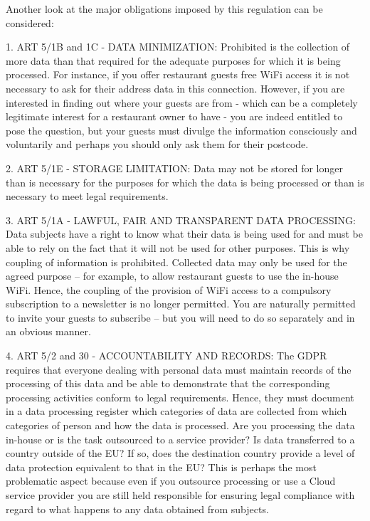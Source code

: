 \documentclass[12pt]{amsart}
\begin{document}
\begin{multicols}{2}
Another look at the major obligations imposed by this
regulation can be considered\cite{tata17}:


\vspace{0.35cm}
1. ART 5/1B and 1C - DATA MINIMIZATION:
Prohibited is the collection of more data than that required for the
adequate purposes for which it is being processed. For instance, if
you offer restaurant guests free WiFi access it is not necessary to
ask for their address data in this connection. However, if you are
interested in finding out where your guests are from - which can be a
completely legitimate interest for a restaurant owner to have - you
are indeed entitled to pose the question, but your guests must divulge
the information consciously and voluntarily and perhaps you should
only ask them for their postcode.

\vspace{0.35cm}
2. ART 5/1E - STORAGE LIMITATION:
Data may not be stored for longer than is necessary for the purposes
for which the data is being processed or than is necessary to meet
legal requirements.

\vspace{0.35cm}
3. ART 5/1A - LAWFUL, FAIR AND TRANSPARENT DATA
PROCESSING: Data subjects have a right to know what their data is
being used for and must be able to rely on the fact that it will not
be used for other purposes. This is why coupling of information is
prohibited. Collected data may only be used for the agreed purpose –
for example, to allow restaurant guests to use the in-house
WiFi. Hence, the coupling of the provision of WiFi access to a
compulsory subscription to a newsletter is no longer permitted. You
are naturally permitted to invite your guests to subscribe – but you
will need to do so separately and in an obvious manner.

\vspace{0.35cm}
4. ART 5/2
and 30 - ACCOUNTABILITY AND RECORDS: The GDPR requires that everyone
dealing with personal data must maintain records of the processing of
this data and be able to demonstrate that the corresponding processing
activities conform to legal requirements. Hence, they must document in
a data processing register which categories of data are collected from
which categories of person and how the data is processed. Are you
processing the data in-house or is the task outsourced to a service
provider? Is data transferred to a country outside of the EU? If so,
does the destination country provide a level of data protection
equivalent to that in the EU? This is perhaps the most problematic
aspect because even if you outsource processing or use a Cloud service
provider you are still held responsible for ensuring legal compliance
with regard to what happens to any data obtained from subjects.


\end{multicols}
\end{document}
